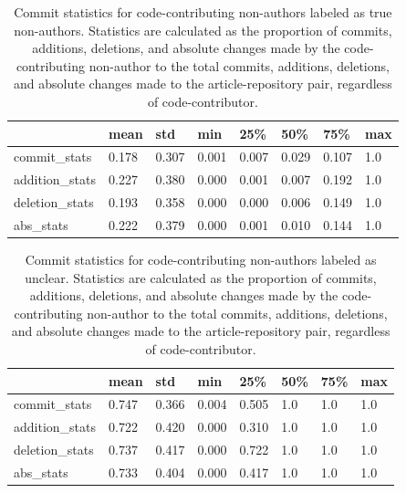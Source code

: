 \documentclass[
  letterpaper,
  DIV=11,
  numbers=noendperiod]{scrartcl}
\begin{document}
\begin{longtable}[]{@{}llllllll@{}}

\caption{\label{tbl-true-cc-na-commit-stats}Commit statistics for
code-contributing non-authors labeled as true non-authors. Statistics
are calculated as the proportion of commits, additions, deletions, and
absolute changes made by the code-contributing non-author to the total
commits, additions, deletions, and absolute changes made to the
article-repository pair, regardless of code-contributor.}

\tabularnewline

\toprule\noalign{}
& mean & std & min & 25\% & 50\% & 75\% & max \\
\midrule\noalign{}
\endhead
\bottomrule\noalign{}
\endlastfoot
commit\_stats & 0.178 & 0.307 & 0.001 & 0.007 & 0.029 & 0.107 & 1.0 \\
addition\_stats & 0.227 & 0.380 & 0.000 & 0.001 & 0.007 & 0.192 & 1.0 \\
deletion\_stats & 0.193 & 0.358 & 0.000 & 0.000 & 0.006 & 0.149 & 1.0 \\
abs\_stats & 0.222 & 0.379 & 0.000 & 0.001 & 0.010 & 0.144 & 1.0 \\

\end{longtable}

\begin{longtable}[]{@{}llllllll@{}}

\caption{\label{tbl-unclear-cc-na-commit-stats}Commit statistics for
code-contributing non-authors labeled as unclear. Statistics are
calculated as the proportion of commits, additions, deletions, and
absolute changes made by the code-contributing non-author to the total
commits, additions, deletions, and absolute changes made to the
article-repository pair, regardless of code-contributor.}

\tabularnewline

\toprule\noalign{}
& mean & std & min & 25\% & 50\% & 75\% & max \\
\midrule\noalign{}
\endhead
\bottomrule\noalign{}
\endlastfoot
commit\_stats & 0.747 & 0.366 & 0.004 & 0.505 & 1.0 & 1.0 & 1.0 \\
addition\_stats & 0.722 & 0.420 & 0.000 & 0.310 & 1.0 & 1.0 & 1.0 \\
deletion\_stats & 0.737 & 0.417 & 0.000 & 0.722 & 1.0 & 1.0 & 1.0 \\
abs\_stats & 0.733 & 0.404 & 0.000 & 0.417 & 1.0 & 1.0 & 1.0 \\

\end{longtable}
\end{document}

